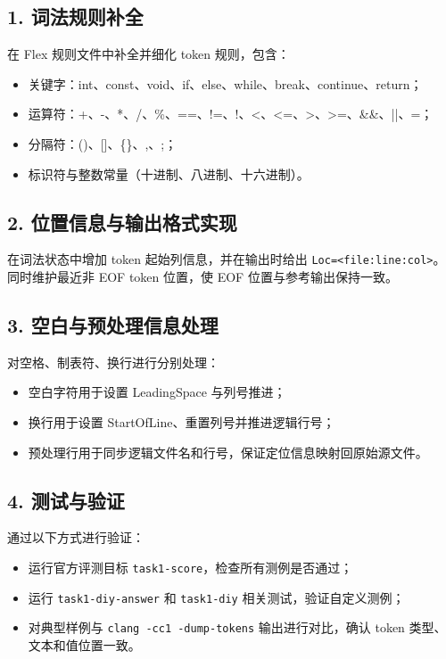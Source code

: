 \documentclass[UTF8,a4paper,12pt]{ctexart}
\begin{document}
\subsection*{1. 词法规则补全}
在 Flex 规则文件中补全并细化 token 规则，包含：
\begin{itemize}
  \item 关键字：int、const、void、if、else、while、break、continue、return；
  \item 运算符：+、-、*、/、\%、==、!=、!、<、<=、>、>=、\&\&、||、=；
  \item 分隔符：()、[]、\{\}、,、;；
  \item 标识符与整数常量（十进制、八进制、十六进制）。
\end{itemize}

\subsection*{2. 位置信息与输出格式实现}
在词法状态中增加 token 起始列信息，并在输出时给出
\texttt{Loc=<file:line:col>}。同时维护最近非 EOF token 位置，使 EOF 位置与参考输出保持一致。

\subsection*{3. 空白与预处理信息处理}
对空格、制表符、换行进行分别处理：
\begin{itemize}
  \item 空白字符用于设置 LeadingSpace 与列号推进；
  \item 换行用于设置 StartOfLine、重置列号并推进逻辑行号；
  \item 预处理行用于同步逻辑文件名和行号，保证定位信息映射回原始源文件。
\end{itemize}

\subsection*{4. 测试与验证}
通过以下方式进行验证：
\begin{itemize}
  \item 运行官方评测目标 \texttt{task1-score}，检查所有测例是否通过；
  \item 运行 \texttt{task1-diy-answer} 和 \texttt{task1-diy} 相关测试，验证自定义测例；
  \item 对典型样例与 \texttt{clang -cc1 -dump-tokens} 输出进行对比，确认 token 类型、文本和值位置一致。
\end{itemize}
\end{document}
